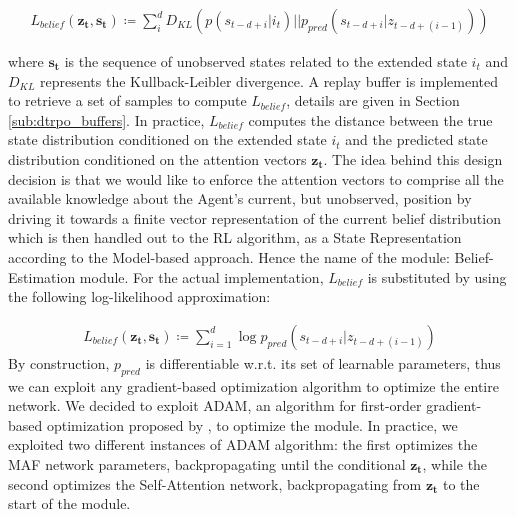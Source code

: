             \begin{align}
                L_{belief}(\mathbf{z_{t}}, \mathbf{s_t}) \coloneqq \sum_{i}^{d} D_{KL} \left( p(s_{t-d+i} \vert i_t) || p_{pred}(s_{t-d+i} \vert z_{t-d+(i-1)}) \right)
            \end{align}
            
            where $\mathbf{s_t}$ is the sequence of unobserved states related to the extended state $i_t$ and $D_{KL}$ represents the Kullback-Leibler divergence. A replay buffer is implemented to retrieve a set of samples to compute $L_{belief}$, details are given in Section \ref{sub:dtrpo_buffers}. In practice, $L_{belief}$ computes the distance between the true state distribution conditioned on the extended state $i_t$ and the predicted state distribution conditioned on the attention vectors $\mathbf{z_t}$. The idea behind this design decision is that we would like to enforce the attention vectors to comprise all the available knowledge about the Agent's current, but unobserved, position by driving it towards a finite vector representation of the current belief distribution which is then handled out to the RL algorithm, as a State Representation according to the Model-based approach. Hence the name of the module: Belief-Estimation module. \newline
            For the actual implementation, $L_{belief}$ is substituted by using the following log-likelihood approximation:
            
            \begin{align}
                L_{belief}(\mathbf{z_t}, \mathbf{s_t}) \coloneqq \sum_{i=1}^{d} \log p_{pred} \left(s_{t-d+i} \vert z_{t-d+(i-1)} \right)
            \end{align}
            \noindent
            By construction, $p_{pred}$ is differentiable w.r.t. its set of learnable parameters, thus we can exploit any gradient-based optimization algorithm to optimize the entire network. We decided to exploit ADAM, an algorithm for first-order gradient-based optimization proposed by , to optimize the module. In practice, we exploited two different instances of ADAM algorithm: the first optimizes the MAF network parameters, backpropagating until the conditional $\mathbf{z_t}$, while the second optimizes the Self-Attention network, backpropagating from $\mathbf{z_t}$ to the start of the module.
        
    \newpage
